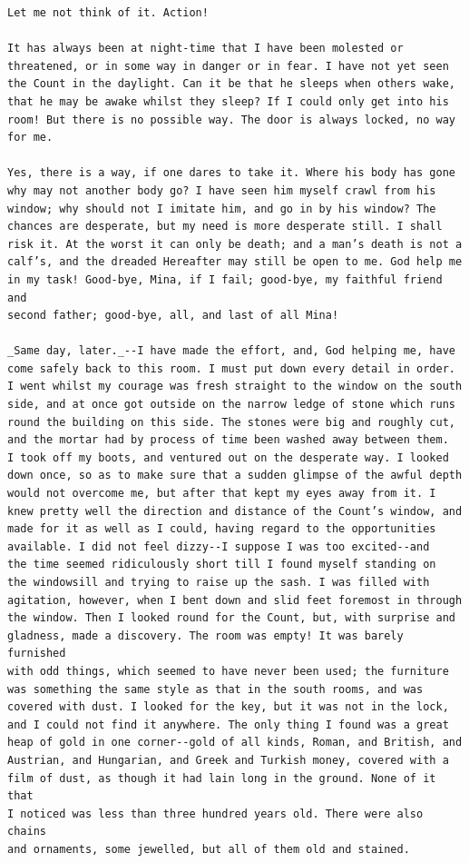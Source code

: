 \documentclass{article}
\begin{document}
\begin{verbatim}
Let me not think of it. Action!

It has always been at night-time that I have been molested or
threatened, or in some way in danger or in fear. I have not yet seen
the Count in the daylight. Can it be that he sleeps when others wake,
that he may be awake whilst they sleep? If I could only get into his
room! But there is no possible way. The door is always locked, no way
for me.

Yes, there is a way, if one dares to take it. Where his body has gone
why may not another body go? I have seen him myself crawl from his
window; why should not I imitate him, and go in by his window? The
chances are desperate, but my need is more desperate still. I shall
risk it. At the worst it can only be death; and a man’s death is not a
calf’s, and the dreaded Hereafter may still be open to me. God help me
in my task! Good-bye, Mina, if I fail; good-bye, my faithful friend and
second father; good-bye, all, and last of all Mina!

_Same day, later._--I have made the effort, and, God helping me, have
come safely back to this room. I must put down every detail in order.
I went whilst my courage was fresh straight to the window on the south
side, and at once got outside on the narrow ledge of stone which runs
round the building on this side. The stones were big and roughly cut,
and the mortar had by process of time been washed away between them.
I took off my boots, and ventured out on the desperate way. I looked
down once, so as to make sure that a sudden glimpse of the awful depth
would not overcome me, but after that kept my eyes away from it. I
knew pretty well the direction and distance of the Count’s window, and
made for it as well as I could, having regard to the opportunities
available. I did not feel dizzy--I suppose I was too excited--and
the time seemed ridiculously short till I found myself standing on
the windowsill and trying to raise up the sash. I was filled with
agitation, however, when I bent down and slid feet foremost in through
the window. Then I looked round for the Count, but, with surprise and
gladness, made a discovery. The room was empty! It was barely furnished
with odd things, which seemed to have never been used; the furniture
was something the same style as that in the south rooms, and was
covered with dust. I looked for the key, but it was not in the lock,
and I could not find it anywhere. The only thing I found was a great
heap of gold in one corner--gold of all kinds, Roman, and British, and
Austrian, and Hungarian, and Greek and Turkish money, covered with a
film of dust, as though it had lain long in the ground. None of it that
I noticed was less than three hundred years old. There were also chains
and ornaments, some jewelled, but all of them old and stained.


\end{verbatim}
\end{document}
